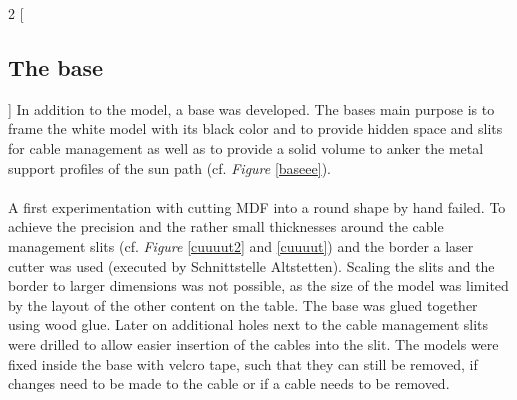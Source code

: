 \documentclass[a4paper,9pt]{article}
\begin{document}
\newpage
\begin{multicols}{2}
[
\subsection{The base}
]
    In addition to the model, a base was developed. The bases main purpose is to frame the white model with its black color and to provide hidden space and slits for cable management as well as to provide a solid volume to anker the metal support profiles of the sun path (cf. \textit{Figure} \ref{baseee}).\\
    \\
    A first experimentation with cutting MDF into a round shape by hand failed. To achieve the precision and the rather small thicknesses around the cable management slits (cf. \textit{Figure} \ref{cuuuut2} and \ref{cuuuut}) and the border a laser cutter was used (executed by Schnittstelle Altstetten). Scaling the slits and the border to larger dimensions was not possible, as the size of the model was limited by the layout of the other content on the table. The base was glued together using wood glue. Later on additional holes next to the cable management slits were drilled to allow easier insertion of the cables into the slit. The models were fixed inside the base with velcro tape, such that they can still be removed, if changes need to be made to the cable or if a cable needs to be removed.
\end{multicols}
\end{document}
